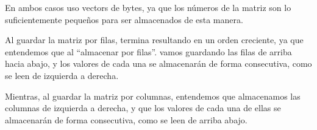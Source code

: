 \documentclass[a4paper]{report}
\begin{document}
En ambos casos uso vectors de bytes, ya que los números de la matriz son lo suficientemente pequeños para ser almacenados de esta manera.

Al guardar la matriz por filas, termina resultando en un orden creciente, ya que entendemos que al ``almacenar por filas''. vamos guardando las filas de arriba hacia abajo, y los valores de cada una se almacenarán de forma consecutiva, como se leen de izquierda a derecha.

Mientras, al guardar la matriz por columnas, entendemos que almacenamos las columnas de izquierda a derecha, y que los valores de cada una de ellas se almacenarán de forma consecutiva, como se leen de arriba abajo.

\begin{figure}[h]
    \centering
    \captionsetup{justification = centering}


\end{figure}
\end{document}
